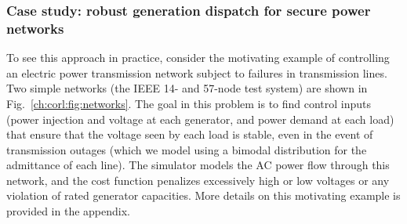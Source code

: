 {%



\subsubsection{Case study: robust generation dispatch for secure power networks}

To see this approach in practice, consider the motivating example of controlling an electric power transmission network subject to failures in transmission lines. Two simple networks (the IEEE 14- and 57-node test system) are shown in Fig.~\ref{ch:corl:fig:networks}. The goal in this problem is to find control inputs (power injection and voltage at each generator, and power demand at each load) that ensure that the voltage seen by each load is stable, even in the event of transmission outages (which we model using a bimodal distribution for the admittance of each line). The simulator models the AC power flow through this network, and the cost function penalizes excessively high or low voltages or any violation of rated generator capacities. More details on this motivating example is provided in the appendix.

}
